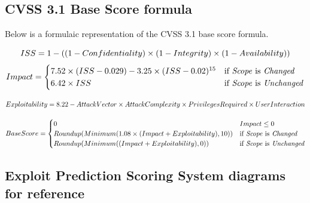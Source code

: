 \documentclass[12pt]{article}
\begin{document}
\subsection{CVSS 3.1 Base Score formula} \label{equation}

Below is a formulaic representation of the CVSS 3.1 base score formula.
	{\scriptsize
		\begin{equation}
			ISS = 1 - ((1 - Confidentiality) \times (1 - Integrity) \times (1 - Availability)) \\
		\end{equation}
		\begin{equation}
			Impact =
			\begin{cases}
				7.52 \times (ISS - 0.029) - 3.25 \times (ISS - 0.02)^{15} & \text{if \textit{Scope} is
				\textit{Changed}}                                                                      \\
				6.42 \times ISS                                           & \text{if \textit{Scope} is
					\textit{Unchanged}}
			\end{cases}
		\end{equation}

		\begin{equation}
			Exploitability = 8.22 - AttackVector \times AttackComplexity \times PrivilegesRequired \times
			UserInteraction \\
		\end{equation}

		\begin{equation}
			Base Score =
			\begin{cases}
				0                                                           & Impact \leq 0              \\
				Roundup(Minimum(1.08 \times (Impact + Exploitability), 10)) & \text{if \textit{Scope} is
				\textit{Changed}}                                                                        \\
				Roundup(Minimum((Impact + Exploitability), 0))              & \text{if \textit{Scope} is
				\textit{Unchanged}}                                                                      \\
			\end{cases}
		\end{equation}
	}

\subsection{Exploit Prediction Scoring System diagrams for reference}
\end{document}
